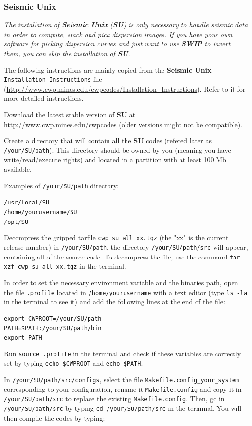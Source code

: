 \documentclass[twoside,a4paper]{article}
\def\SWIP{\textbf{SWIP}}
\def\SU{\textbf{SU}}
\def\SeismicUnix{\textbf{Seismic Unix}}
\begin{document}
\subsubsection{Seismic Unix}
\textit{The installation of {\SeismicUnix} ({\SU}) is only necessary to handle seismic data in order to compute, stack and pick dispersion images. If you have your own software for picking dispersion curves and just want to use {\SWIP} to invert them, you can skip the installation of {\SU}.}

The following instructions are mainly copied from the {\SeismicUnix} \verb|Installation_Instructions| file (\url{http://www.cwp.mines.edu/cwpcodes/Installation_Instructions}). Refer to it for more detailed instructions.

Download the latest stable version of {\SU} at \url{http://www.cwp.mines.edu/cwpcodes} (older versions might not be compatible).

Create a directory that will contain all the {\SU} codes (refered later as \verb|/your/SU/path|). This directory should be owned by you (meaning you have write/read/execute rights) and located in a partition with at least 100 Mb available.

Examples of \verb|/your/SU/path| directory:

\verb|/usr/local/SU|\\
\verb|/home/yourusername/SU|\\
\verb|/opt/SU|

Decompress the gzipped tarfile \verb|cwp_su_all_xx.tgz| (the "xx" is the current release number) in \verb|/your/SU/path|, the directory \verb|/your/SU/path/src| will appear, containing all of the source code. To decompress the file, use the command \verb|tar -xzf cwp_su_all_xx.tgz| in the terminal.

In order to set the necessary environment variable and the binaries path, open the file \verb|.profile| located in \verb|/home/yourusername| with a text editor (type \verb|ls -la| in the terminal to see it) and add the following lines at the end of the file:

\verb|export CWPROOT=/your/SU/path|\\
\verb|PATH=$PATH:/your/SU/path/bin|\\
\verb|export PATH|

Run \verb|source .profile| in the terminal and check if these variables are correctly set by typing \verb|echo $CWPROOT| and \verb|echo $PATH|.

In \verb|/your/SU/path/src/configs|, select the file \verb|Makefile.config_your_system| corresponding to your configuration, rename it \verb|Makefile.config| and copy it in \verb|/your/SU/path/src| to replace the existing \verb|Makefile.config|. Then, go in \verb|/your/SU/path/src| by typing \verb|cd /your/SU/path/src| in the terminal. You will then compile the codes by typing:
\end{document}
